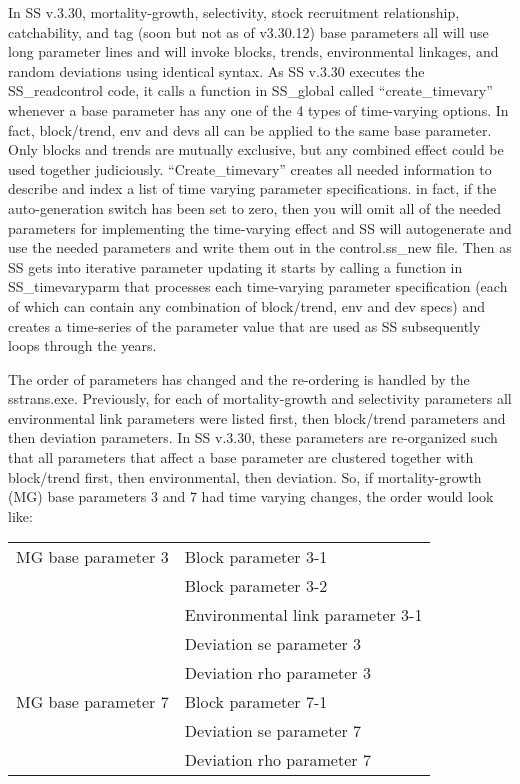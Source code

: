 In SS v.3.30, mortality-growth, selectivity, stock recruitment relationship, catchability, and tag (soon but not as of v3.30.12) base parameters all will use long parameter lines and will invoke blocks, trends, environmental linkages, and random deviations using identical syntax.   As SS v.3.30 executes the SS\_readcontrol code, it calls a function in SS\_global called “create\_timevary” whenever a base parameter has any one of the 4 types of time-varying options.  In fact, block/trend, env and devs all can be applied to the same base parameter.  Only blocks and trends are mutually exclusive, but any combined effect could be used together judiciously.  “Create\_timevary” creates all needed information to describe and index a list of time varying parameter specifications.  in fact, if the auto-generation switch has been set to zero, then you will omit all of the needed parameters for implementing the time-varying effect and SS will autogenerate and use the needed parameters and write them out in the control.ss\_new file. Then as SS gets into iterative parameter updating it starts by calling a function in SS\_timevaryparm that processes each time-varying parameter specification (each of which can contain any combination of block/trend, env and dev specs) and creates a time-series of the parameter value that are used as SS subsequently loops through the years.

The order of parameters has changed and the re-ordering is handled by the sstrans.exe.  Previously, for each of mortality-growth and selectivity parameters all environmental link parameters were listed first, then block/trend parameters and then deviation parameters.  In SS v.3.30, these parameters are re-organized such that all parameters that affect a base parameter are clustered together with block/trend first, then environmental, then deviation.  So, if mortality-growth (MG) base parameters 3 and 7 had time varying changes, the order would look like:
 
 \begin{center}
 	\begin{longtable}{p{5cm} p{10cm}}
	 	\hline
	 	MG base parameter 3 & Block parameter 3-1\Tstrut\\
	 	                    & Block parameter 3-2\\
	 	                    & Environmental link parameter 3-1\\
	 	                    & Deviation se parameter 3 \\
	 	                    & Deviation rho parameter 3 \Bstrut\\
		MG base parameter 7 & Block parameter 7-1 \\
							& Deviation se parameter 7 \\
							& Deviation rho parameter 7 \Bstrut\\
		\hline	 	                    
	 	       
 	\end{longtable}
 \end{center}

